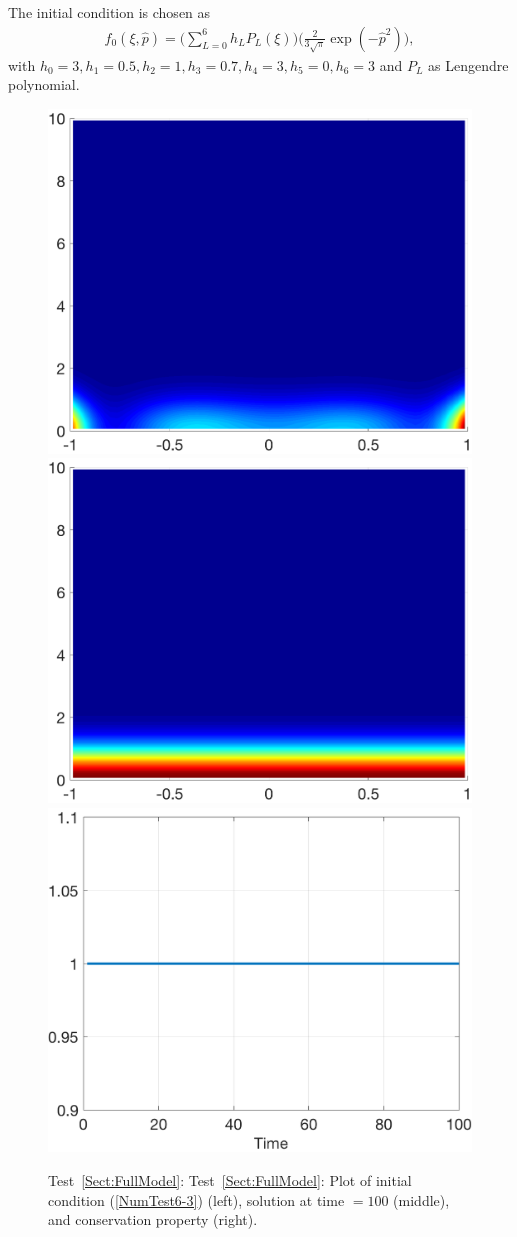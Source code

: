 \documentclass[preprint,11pt]{elsarticle}
\begin{document}
%
%


The initial condition is chosen as 
\begin{eqnarray}
 f_0(\xi,\hat{p})=\bigg(\sum_{L=0}^6 h_L P_L(\xi)\bigg) \bigg(\frac{2}{3\sqrt{\pi}}\exp(-\hat{p}^2)\bigg), \label{NumTest6-3}
\end{eqnarray}
with $h_0 = 3, h_1=0.5, h_2 = 1, h_3 = 0.7, h_4 = 3, h_5 = 0, h_6 = 3$ and $P_L$ as Lengendre polynomial.

\begin{figure}[H]
\centering
\includegraphics[width=.32\textwidth]{./NumFig/FullModel2D-3-1}
\includegraphics[width=.32\textwidth]{./NumFig/FullModel2D-3-100}
\includegraphics[width=.32\textwidth]{./NumFig/FullModel2D-3-conv}
\caption{Test~\ref{Sect:FullModel}: Test~\ref{Sect:FullModel}: Plot of initial condition (\ref{NumTest6-3}) (left), solution at time $= 100$ (middle), and conservation property (right).}
\end{figure}
\end{document}
